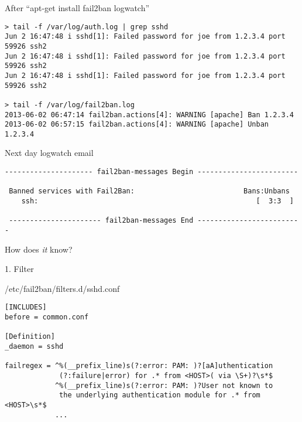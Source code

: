 \documentclass[]{beamer}
\begin{document}
\begin{frame}[fragile]{After ``apt-get install fail2ban logwatch''}

\begin{Verbatim}[commandchars=\\\{\},fontsize=\scriptsize]
> tail -f /var/log/auth.log | grep sshd
Jun 2 16:47:48 i sshd[1]: Failed password for joe from 1.2.3.4 port 59926 ssh2
Jun 2 16:47:48 i sshd[1]: Failed password for joe from 1.2.3.4 port 59926 ssh2
Jun 2 16:47:48 i sshd[1]: Failed password for joe from 1.2.3.4 port 59926 ssh2

> tail -f /var/log/fail2ban.log
2013-06-02 06:47:14 fail2ban.actions[4]: WARNING [apache] Ban 1.2.3.4
2013-06-02 06:57:15 fail2ban.actions[4]: WARNING [apache] Unban 1.2.3.4
\end{Verbatim}

\begin{block}{Next day logwatch email}

\begin{Verbatim}[commandchars=\\\{\},fontsize=\scriptsize]
 --------------------- fail2ban-messages Begin ------------------------

 Banned services with Fail2Ban:                          Bans:Unbans
    ssh:                                                    [  3:3  ]

 ---------------------- fail2ban-messages End -------------------------
\end{Verbatim}
\end{block}

\end{frame}

\begin{frame}{}
\begin{center}
\Large How does \emph{it} know?
\end{center}
\end{frame}

\begin{frame}[fragile]{1. Filter}

\begin{block}{/etc/fail2ban/filters.d/sshd.conf}
{\scriptsize
\begin{verbatim}
[INCLUDES]
before = common.conf

[Definition]
_daemon = sshd

failregex = ^%(__prefix_line)s(?:error: PAM: )?[aA]uthentication
             (?:failure|error) for .* from <HOST>( via \S+)?\s*$
            ^%(__prefix_line)s(?:error: PAM: )?User not known to
             the underlying authentication module for .* from <HOST>\s*$
            ...
\end{verbatim}
}
\end{block}
\end{frame}
\end{document}
